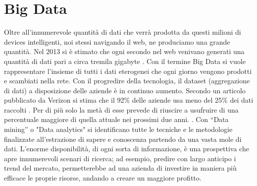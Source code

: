 \section{Big Data}
Oltre all'innumerevole quantità di dati che verrà prodotta da questi milioni di
devices intelligenti, noi stessi navigando il web, ne produciamo una grande
quantità. Nel 2013 si è stimato che ogni secondo nel web venivano generati una
quantità di dati pari a circa tremila gigabyte . Con il termine Big Data si vuole
rappresentare l'insieme di tutti i dati eterogenei che ogni giorno vengono
prodotti e scambiati nella rete.
Con il progredire della tecnologia, il dataset (aggregazione di dati) a
disposizione delle aziende è in continuo aumento.
Secondo un articolo pubblicato da Verizon si stima che il 92\% delle aziende
usa meno del 25\% dei dati raccolti \cite{VerizionIoT}. Per di più  solo la metà
di esse prevede di riuscire a usufruire di una percentuale maggiore di quella attuale
nei prossimi due anni.
\cite{VerizionIoT}.  Con “Data mining” o "Data analytics"  si identificano tutte le
tecniche e le metodologie finalizzate all’estrazione di sapere e conoscenza
partendo da una vasta mole di dati.
L’enorme disponibilità, di ogni sorta di informazione, è una prospettiva che 
apre innumerevoli scenari di ricerca; ad esempio, predire con largo anticipo i 
trend del mercato, permetterebbe ad una azienda di investire in maniera più
efficace le proprie risorse, andando a creare un maggiore profitto.


